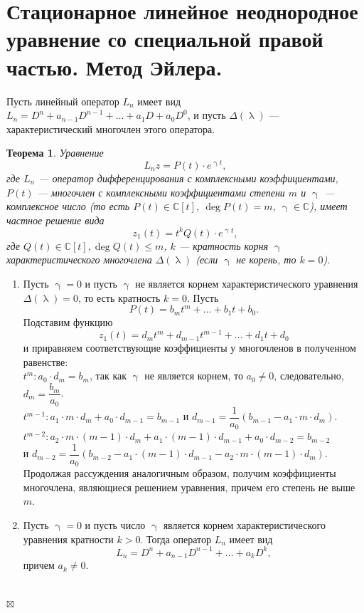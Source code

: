 \documentclass[a4paper, 12pt]{report}
\newenvironment{Proof} %
{\par\noindent{$\blacklozenge$}} %
{\hfill$\scriptstyle\boxtimes$}
\newcommand{\Cm}{\mathbb{C}}
\renewcommand{\lambda}{\uplambda}
\newcommand{\Ln}{L_n = D^n + a_{n-1}D^{n-1} + \ldots + a_1D + a_0D^0}
\begin{document}
\section{Стационарное линейное неоднородное уравнение со специальной правой частью. Метод Эйлера.}
Пусть линейный оператор $L_n$ имеет вид $\Ln$, и пусть $\Delta(\lambda)$ --- характеристический многочлен этого оператора.
\newtheorem*{2_5_1}{Теорема}\begin{2_5_1}
	Уравнение $$L_nz = P(t)\cdot e^{\upgamma t},$$ где $L_n$ --- оператор дифференцирования с комплексными коэффициентами, $P(t)$ --- многочлен с комплексными коэффициентами степени $m$ и $\upgamma$ --- комплексное число (то есть $P(t)\in\Cm[t]$, $\deg P(t) = m$, $\upgamma \in \Cm$), имеет частное решение вида $$z_1(t) = t^kQ(t)\cdot e^{\upgamma t},$$ где $Q(t) \in \Cm[t], \deg Q(t) \leqslant m$, $k$ --- кратность корня $\upgamma$ характеристического многочлена $\Delta(\lambda)$ (если $\upgamma$ не корень, то $k=0$).
\end{2_5_1}\begin{Proof}
\begin{enumerate}
	\item Пусть $\upgamma = 0$ и пусть $\upgamma$ не является корнем характеристического уравнения $\Delta(\lambda) = 0$, то есть кратность $k = 0$. Пусть $$P(t) = b_mt^m + \ldots + b_1t + b_0.$$ Подставим функцию $$z_1(t) = d_mt^m + d_{m-1}t^{m-1} + \ldots + d_1t + d_0$$ и приравняем соответствующие коэффициенты у многочленов в полученном равенстве:\\
	$t^m : a_0\cdot d_m = b_m$, так как $\upgamma$ не является корнем, то $a_0 \ne 0$, следовательно, $d_m = \dfrac{b_m}{a_0}$.\\
	$t^{m-1} : a_1\cdot m\cdot d_m + a_0\cdot  d_{m-1}= b_{m-1}$ и $d_{m-1} = \dfrac{1}{a_0}(b_{m-1} - a_1\cdot m \cdot d_m)$.\\
	$t^{m-2} : a_2\cdot m\cdot (m-1)\cdot d_m + a_1\cdot (m-1) \cdot d_{m-1} + a_0 \cdot d_{m-2} = b_{m-2}$\\ и $d_{m-2} = \dfrac{1}{a_0}(b_{m-2} - a_1\cdot (m-1)\cdot d_{m-1}- a_2\cdot m\cdot (m-1)\cdot d_m)$.\\
	Продолжая рассуждения аналогичным образом, получим коэффициенты многочлена, являющиеся решением уравнения, причем его степень не выше $m$.
	\item Пусть $\upgamma = 0$ и пусть число $\upgamma$ является корнем характеристического уравнения кратности $k > 0$. Тогда оператор $L_n$ имеет вид $$L_n = D^n + a_{n-1}D^{n-1} + \ldots + a_k D^{k},$$ причем $a_k \ne 0$.\\\\

\end{enumerate}
\end{Proof}
\end{document}
